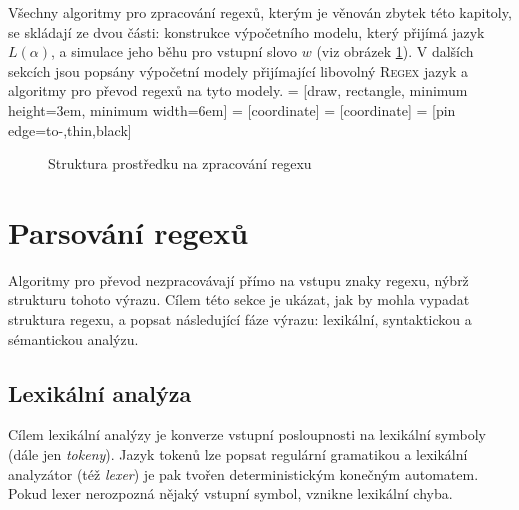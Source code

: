 \documentclass[thesis=B,czech]{FITthesis}[2019/12/23]
\theoremstyle{definition}
\begin{document}
Všechny algoritmy pro zpracování regexů, kterým je věnován zbytek této kapitoly, se skládají ze dvou části: konstrukce výpočetního modelu, který přijímá jazyk $L\left(\alpha\right)$, a simulace jeho běhu pro vstupní slovo $w$ (viz obrázek \ref{fig:engine}). V dalších sekcích jsou popsány výpočetní modely přijímající libovolný \textsc{Regex} jazyk a algoritmy pro převod regexů na tyto modely.
 = [draw, rectangle, 
    minimum height=3em, minimum width=6em]
 = [coordinate]
 = [coordinate]
 = [pin edge={to-,thin,black}]
\begin{figure}[h]
\centering
{}
\caption{Struktura prostředku na zpracování regexu}\label{fig:engine}
\end{figure}
\section{Parsování regexů}
Algoritmy pro převod nezpracovávají přímo na vstupu znaky regexu, nýbrž strukturu tohoto výrazu. Cílem této sekce je ukázat, jak by mohla vypadat struktura regexu, a popsat následující fáze  výrazu: lexikální, syntaktickou a sémantickou analýzu.

\subsection{Lexikální analýza}
Cílem lexikální analýzy je konverze vstupní posloupnosti na lexikální symboly (dále jen \emph{tokeny}). Jazyk tokenů lze popsat regulární gramatikou a lexikální analyzátor (též \emph{lexer}) je pak tvořen deterministickým konečným automatem. Pokud lexer nerozpozná nějaký vstupní symbol, vznikne lexikální chyba. 
\end{document}
